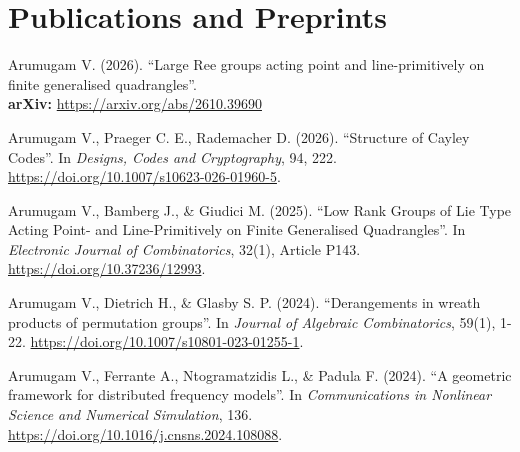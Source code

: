 \documentclass[11pt,a4paper]{article}
\newcommand{\cventry}[4]{%
  \par\addvspace{7pt}\noindent
  \begin{minipage}[t]{26mm}\raggedright\small\sffamily\color{muted}#1\end{minipage}%
  \begin{minipage}[t]{\dimexpr\textwidth-26mm\relax}
    \setlength{\parskip}{2pt}\raggedright
    \textbf{#2}\par #3\par
    \ifstrempty{#4}{}{\small #4\par}
  \end{minipage}\par}
\begin{document}

\section{Publications and Preprints}
\begin{enumerate}[{[1]}]
\item Arumugam V. (2026). ``Large Ree groups acting point and line-primitively on 
finite generalised quadrangles''.  \\
\textbf{arXiv:} \href{https://arxiv.org/abs/2610.39690}{https://arxiv.org/abs/2610.39690}

\item Arumugam V., Praeger C. E., Rademacher D. (2026). ``Structure of Cayley 
Codes''.  In \emph{Designs, Codes and Cryptography}, 94, 222. 
\href{https://doi.org/10.1007/s10623-026-01960-5}{https://doi.org/10.1007/s10623-026-01960-5}.

\item Arumugam V., Bamberg J., \& Giudici M. (2025). ``Low Rank Groups of Lie 
Type Acting Point- and Line-Primitively on Finite Generalised Quadrangles''. 
In \emph{Electronic Journal of Combinatorics}, 32(1), Article P143. 
\href{https://doi.org/10.37236/12993}{https://doi.org/10.37236/12993}. 

\item Arumugam V., Dietrich H., \& Glasby S. P. (2024). ``Derangements in wreath 
products of permutation groups''. In \emph{Journal of Algebraic
Combinatorics}, 59(1), 1-22.
\href{https://doi.org/10.1007/s10801-023-01255-1}
{https://doi.org/10.1007/s10801-023-01255-1}. 

\item Arumugam V., Ferrante A., Ntogramatzidis L., \& Padula F. (2024). 
``A geometric framework for distributed frequency models''. 
In \emph{Communications in Nonlinear Science and Numerical Simulation}, 136. 
\href{https://doi.org/10.1016/j.cnsns.2024.108088}
{https://doi.org/10.1016/j.cnsns.2024.108088}. 


\end{enumerate}
\end{document}
